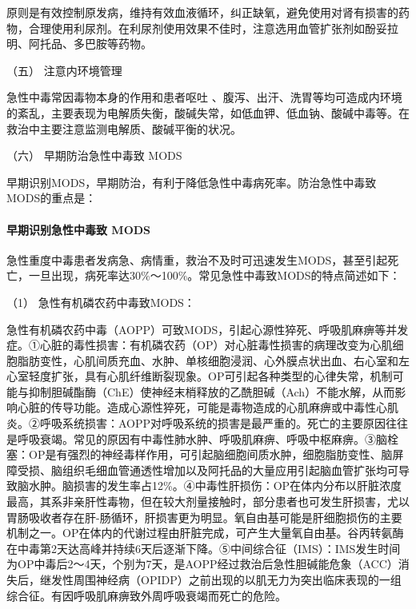 原则是有效控制原发病，维持有效血液循环，纠正缺氧，避免使用对肾有损害的药物，合理使用利尿剂。在利尿剂使用效果不佳时，注意选用血管扩张剂如酚妥拉明、阿托品、多巴胺等药物。

\hypertarget{text00130.htmlux5cux23CHP5-1-3-2-5}{}
（五） 注意内环境管理

急性中毒常因毒物本身的作用和患者呕吐
、腹泻、出汗、洗胃等均可造成内环境的紊乱，主要表现为电解质失衡，酸碱失常，如低血钾、低血钠、酸碱中毒等。在救治中主要注意监测电解质、酸碱平衡的状况。

\hypertarget{text00130.htmlux5cux23CHP5-1-3-2-6}{}
（六） 早期防治急性中毒致 MODS

早期识别MODS，早期防治，有利于降低急性中毒病死率。防治急性中毒致MODS的重点是：

\paragraph{早期识别急性中毒致 MODS}

急性重度中毒患者发病急、病情重，救治不及时可迅速发生MODS，甚至引起死亡，一旦出现，病死率达30\%～100\%。常见急性中毒致MODS的特点简述如下：

\hypertarget{text00130.htmlux5cux23CHP5-1-3-2-6-1-1}{}
（1） 急性有机磷农药中毒致MODS：

急性有机磷农药中毒（AOPP）可致MODS，引起心源性猝死、呼吸肌麻痹等并发症。①心脏的毒性损害：有机磷农药（OP）对心脏毒性损害的病理改变为心肌细胞脂肪变性，心肌间质充血、水肿、单核细胞浸润、心外膜点状出血、右心室和左心室轻度扩张，具有心肌纤维断裂现象。OP可引起各种类型的心律失常，机制可能与抑制胆碱酯酶（ChE）使神经末梢释放的乙酰胆碱（Ach）不能水解，从而影响心脏的传导功能。造成心源性猝死，可能是毒物造成的心肌麻痹或中毒性心肌炎。②呼吸系统损害：AOPP对呼吸系统的损害是最严重的。死亡的主要原因往往是呼吸衰竭。常见的原因有中毒性肺水肿、呼吸肌麻痹、呼吸中枢麻痹。③脑栓塞：OP是有强烈的神经毒样作用，可引起脑细胞间质水肿，细胞脂肪变性、脑屏障受损、脑组织毛细血管通透性增加以及阿托品的大量应用引起脑血管扩张均可导致脑水肿。脑损害的发生率占12\%。④中毒性肝损伤：OP在体内分布以肝脏浓度最高，其系非亲肝性毒物，但在较大剂量接触时，部分患者也可发生肝损害，尤以胃肠吸收者存在肝-肠循环，肝损害更为明显。氧自由基可能是肝细胞损伤的主要机制之一。OP在体内的代谢过程由肝脏完成，可产生大量氧自由基。谷丙转氨酶在中毒第2天达高峰并持续6天后逐渐下降。⑤中间综合征（IMS）：IMS发生时间为OP中毒后2～4天，个别为7天，是AOPP经过救治后急性胆碱能危象（ACC）消失后，继发性周围神经病（OPIDP）之前出现的以肌无力为突出临床表现的一组综合征。有因呼吸肌麻痹致外周呼吸衰竭而死亡的危险。

